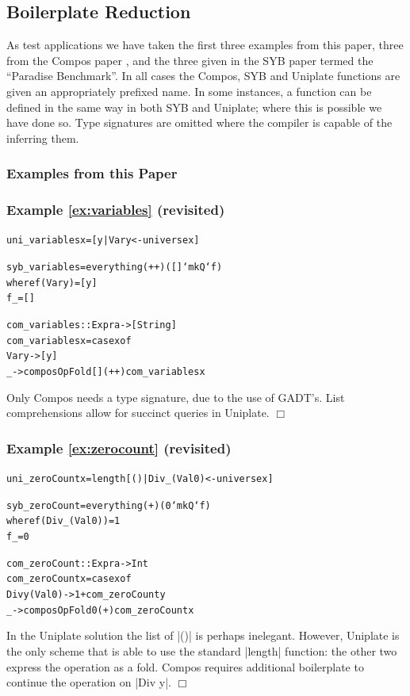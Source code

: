 \documentclass[preprint]{sigplanconf}
\newcommand{\noexample}{\hfill$\Box$}
\newenvironment{code}{\begin{alltt}\small}{\end{alltt}}
\newenvironment{revisit}[1]{\subsubsection*{Example #1 (revisited)}}{\noexample}
\newcommand{\ignore}{}
\begin{document}
\subsection{Boilerplate Reduction}
\label{sec:results_boilerplate}

As test applications we have taken the first three examples from this paper, three from the Compos paper \citep{bringert:compos}, and the three given in the SYB paper \citep{lammel:syb} termed the ``Paradise Benchmark''. In all cases the Compos, SYB and Uniplate functions are given an appropriately prefixed name. In some instances, a function can be defined in the same way in both SYB and Uniplate; where this is possible we have done so. Type signatures are omitted where the compiler is capable of the inferring them.

\subsubsection{Examples from this Paper}

\begin{revisit}{\ref{ex:variables}}

\ignore\begin{code}
uni_variables x = [y | Var y <- universe x]

syb_variables = everything (++) ([] `mkQ` f)
    where  f (Var y)  = [y]
           f _        = []

com_variables :: Expr a -> [String]
com_variables x = case x of
    Var y -> [y]
    _ -> composOpFold [] (++) com_variables x
\end{code}

Only Compos needs a type signature, due to the use of GADT's. List comprehensions allow for succinct queries in Uniplate.
\end{revisit}

\begin{revisit}{\ref{ex:zerocount}}

\ignore\begin{code}
uni_zeroCount x = length [() | Div _ (Val 0) <- universe x]

syb_zeroCount = everything (+) (0 `mkQ` f)
    where  f (Div _ (Val 0))  = 1
           f _                = 0

com_zeroCount :: Expr a -> Int
com_zeroCount x = case x of
    Div y (Val 0) -> 1 + com_zeroCount y
    _ -> composOpFold 0 (+) com_zeroCount x
\end{code}

In the Uniplate solution the list of |()| is perhaps inelegant. However, Uniplate is the only scheme that is able to use the standard |length| function: the other two express the operation as a fold. Compos requires additional boilerplate to continue the operation on |Div y|.
\end{revisit}
\end{document}
